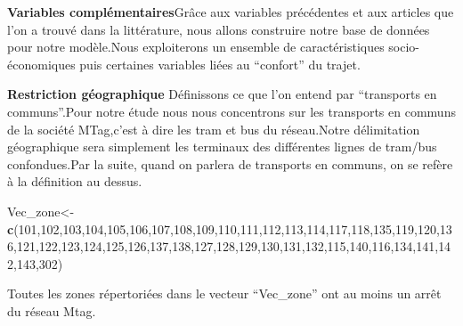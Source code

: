 \documentclass[
]{article}
\newenvironment{Shaded}{\begin{snugshade}}{\end{snugshade}}
\newcommand{\DecValTok}[1]{\textcolor[rgb]{0.00,0.00,0.81}{#1}}
\newcommand{\FunctionTok}[1]{\textcolor[rgb]{0.13,0.29,0.53}{\textbf{#1}}}
\newcommand{\NormalTok}[1]{#1}
\newcommand{\OtherTok}[1]{\textcolor[rgb]{0.56,0.35,0.01}{#1}}
\begin{document}
\textbf{Variables complémentaires}\newline Grâce aux variables
précédentes et aux articles que l'on a trouvé dans la littérature, nous
allons construire notre base de données pour notre modèle.\newline Nous
exploiterons un ensemble de caractéristiques socio-économiques puis
certaines variables liées au ``confort'' du trajet.

\textbf{Restriction géographique} Définissons ce que l'on entend par
``transports en communs''.\newline Pour notre étude nous nous
concentrons sur les transports en communs de la société MTag,c'est à
dire les tram et bus du réseau.\newline Notre délimitation géographique
sera simplement les terminaux des différentes lignes de tram/bus
confondues.\newline Par la suite, quand on parlera de transports en
communs, on se refère à la définition au dessus.

\begin{Shaded}
\begin{Highlighting}[]
\NormalTok{Vec\_zone}\OtherTok{\textless{}{-}}\FunctionTok{c}\NormalTok{(}\DecValTok{101}\NormalTok{,}\DecValTok{102}\NormalTok{,}\DecValTok{103}\NormalTok{,}\DecValTok{104}\NormalTok{,}\DecValTok{105}\NormalTok{,}\DecValTok{106}\NormalTok{,}\DecValTok{107}\NormalTok{,}\DecValTok{108}\NormalTok{,}\DecValTok{109}\NormalTok{,}\DecValTok{110}\NormalTok{,}\DecValTok{111}\NormalTok{,}\DecValTok{112}\NormalTok{,}\DecValTok{113}\NormalTok{,}\DecValTok{114}\NormalTok{,}\DecValTok{117}\NormalTok{,}\DecValTok{118}\NormalTok{,}\DecValTok{135}\NormalTok{,}\DecValTok{119}\NormalTok{,}\DecValTok{120}\NormalTok{,}\DecValTok{136}\NormalTok{,}\DecValTok{121}\NormalTok{,}\DecValTok{122}\NormalTok{,}\DecValTok{123}\NormalTok{,}\DecValTok{124}\NormalTok{,}\DecValTok{125}\NormalTok{,}\DecValTok{126}\NormalTok{,}\DecValTok{137}\NormalTok{,}\DecValTok{138}\NormalTok{,}\DecValTok{127}\NormalTok{,}\DecValTok{128}\NormalTok{,}\DecValTok{129}\NormalTok{,}\DecValTok{130}\NormalTok{,}\DecValTok{131}\NormalTok{,}\DecValTok{132}\NormalTok{,}\DecValTok{115}\NormalTok{,}\DecValTok{140}\NormalTok{,}\DecValTok{116}\NormalTok{,}\DecValTok{134}\NormalTok{,}\DecValTok{141}\NormalTok{,}\DecValTok{142}\NormalTok{,}\DecValTok{143}\NormalTok{,}\DecValTok{302}\NormalTok{)}
\end{Highlighting}
\end{Shaded}

Toutes les zones répertoriées dans le vecteur ``Vec\_zone'' ont au moins
un arrêt du réseau Mtag.
\end{document}
